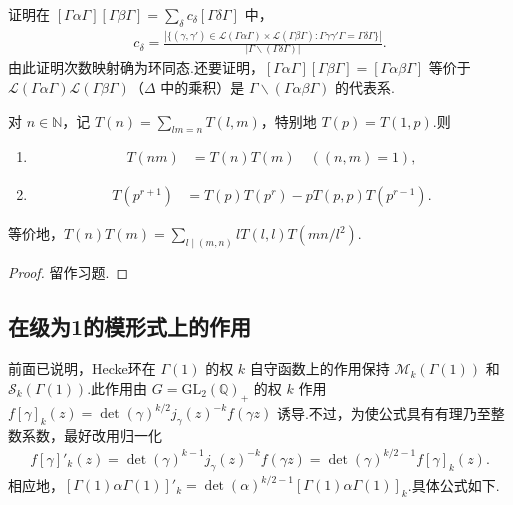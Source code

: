 \begin{exercise*}

证明在 $[\Gamma\alpha\Gamma][\Gamma\beta\Gamma]=\sum_\delta c_\delta[\Gamma\delta\Gamma]$ 中，
\begin{align*}
c_\delta=\frac{|\{(\gamma,\gamma')\in\mathcal L(\Gamma\alpha\Gamma)\times\mathcal L(\Gamma\beta\Gamma):\Gamma\gamma\gamma'\Gamma=\Gamma\delta\Gamma\}|}{|\Gamma\backslash(\Gamma\delta\Gamma)|}.
\end{align*}
由此证明次数映射确为环同态.还要证明，$[\Gamma\alpha\Gamma][\Gamma\beta\Gamma]=[\Gamma\alpha\beta\Gamma]$ 等价于 $\mathcal L(\Gamma\alpha\Gamma)\mathcal L(\Gamma\beta\Gamma)$（$\Delta$ 中的乘积）是 $\Gamma\backslash(\Gamma\alpha\beta\Gamma)$ 的代表系.

\end{exercise*}

\begin{corollary*}

对 $n\in\mathbb N$，记 $T(n)=\sum_{lm=n}T(l,m)$，特别地 $T(p)=T(1,p)$.则

\begin{enumerate}[label=\roman*)]
\item
\begin{align*}
T(nm)&=T(n)T(m)\quad((n,m)=1),
\end{align*}
\item
\begin{align*}
T(p^{r+1})&=T(p)T(p^r)-pT(p,p)T(p^{r-1}).
\end{align*}
\end{enumerate}

等价地，$T(n)T(m)=\sum_{l\mid(m,n)}lT(l,l)T(mn/l^2)$.

\end{corollary*}

\begin{proof}留作习题.\end{proof}

\subsection{在级为1的模形式上的作用}\label{sec:modular-1-3-3}

前面已说明，Hecke环在 $\Gamma(1)$ 的权 $k$ 自守函数上的作用保持 $\mathcal M_k(\Gamma(1))$ 和 $\mathcal S_k(\Gamma(1))$.此作用由 $G=\mathrm{GL}_2(\mathbb Q)_+$ 的权 $k$ 作用 $f[\gamma]_k(z)=\det(\gamma)^{k/2}j_\gamma(z)^{-k}f(\gamma z)$ 诱导.不过，为使公式具有有理乃至整数系数，最好改用归一化
\begin{align*}
f[\gamma]'_k(z)=\det(\gamma)^{k-1}j_\gamma(z)^{-k}f(\gamma z)=\det(\gamma)^{k/2-1}f[\gamma]_k(z).
\end{align*}
相应地，$[\Gamma(1)\alpha\Gamma(1)]'_k=\det(\alpha)^{k/2-1}[\Gamma(1)\alpha\Gamma(1)]_k$.具体公式如下.

